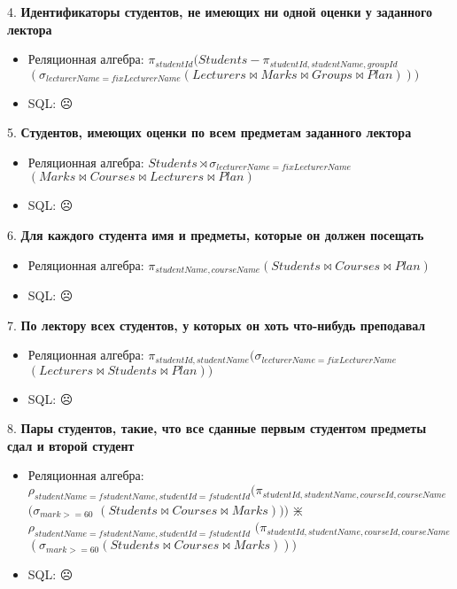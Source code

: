 \documentclass[11pt,a4paper,oneside]{article}
\begin{document}
4. \textbf{Идентификаторы студентов, не имеющих ни одной оценки у заданного лектора}
\begin{itemize}
\item Реляционная алгебра: $\pi_{studentId} (Students - \pi_{studentId, studentName, groupId}$ $(\sigma_{lecturerName = fixLecturerName} (Lecturers \bowtie Marks \bowtie Groups \bowtie Plan)))$
\item SQL: $\frownie{}$
\end{itemize}

5. \textbf{Студентов, имеющих оценки по всем предметам заданного лектора}
\begin{itemize}
\item Реляционная алгебра: $Students \rtimes \sigma_{lecturerName = fixLecturerName}$ $(Marks \bowtie Courses \bowtie Lecturers \bowtie Plan)$
\item SQL: $\frownie{}$
\end{itemize}

6. \textbf{Для каждого студента имя и предметы, которые он должен посещать}
\begin{itemize}
\item Реляционная алгебра: $\pi_{studentName, courseName} (Students \bowtie Courses \bowtie Plan)$
\item SQL: $\frownie{}$
\end{itemize}

7. \textbf{По лектору всех студентов, у которых он хоть что-нибудь преподавал}
\begin{itemize}
\item Реляционная алгебра: $\pi_{studentId, studentName} (\sigma_{lecturerName = fixLecturerName}$ $(Lecturers \bowtie Students \bowtie Plan))$
\item SQL: $\frownie{}$
\end{itemize}

8. \textbf{Пары студентов, такие, что все сданные первым студентом предметы сдал и второй студент}
\begin{itemize}
\item Реляционная алгебра: $\rho_{studentName=fstudentName, studentId=fstudentId} (\pi_{studentId, studentName, courseId, courseName}$ $(\sigma_{mark >= 60}$ $(Students \bowtie Courses \bowtie Marks)))$ $\divideontimes$ $\rho_{studentName=fstudentName, studentId=fstudentId}$ $(\pi_{studentId, studentName, courseId, courseName}$ $(\sigma_{mark >= 60} (Students \bowtie Courses \bowtie Marks)))$
\item SQL: $\frownie{}$
\end{itemize}
\end{document}
